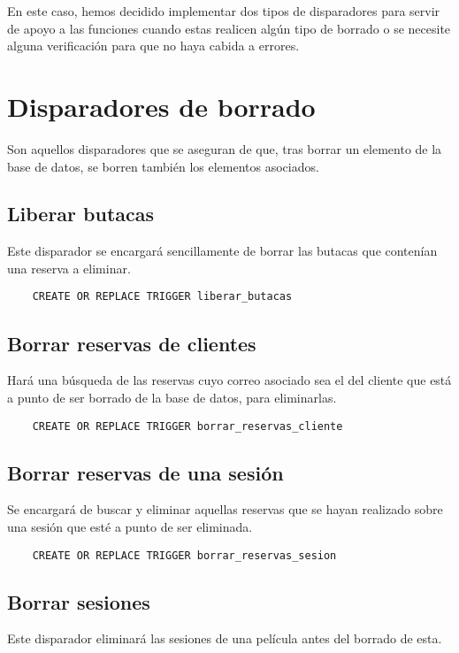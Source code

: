 En este caso, hemos decidido implementar dos tipos de disparadores para servir de apoyo a las funciones cuando estas realicen algún tipo de borrado o se necesite alguna verificación para que no haya cabida a errores.

\section{Disparadores de borrado}
Son aquellos disparadores que se aseguran de que, tras borrar un elemento de la base de datos, se borren también los elementos asociados.

\subsection{Liberar butacas}
Este disparador se encargará sencillamente de borrar las butacas que contenían una reserva a eliminar.

\begin{verbatim}
    CREATE OR REPLACE TRIGGER liberar_butacas
\end{verbatim}

\subsection{Borrar reservas de clientes}
Hará una búsqueda de las reservas cuyo correo asociado sea el del cliente que está a punto de ser borrado de la base de datos, para eliminarlas.

\begin{verbatim}
    CREATE OR REPLACE TRIGGER borrar_reservas_cliente
\end{verbatim}

\subsection{Borrar reservas de una sesión}
Se encargará de buscar y eliminar aquellas reservas que se hayan realizado sobre una sesión que esté a punto de ser eliminada.

\begin{verbatim}
    CREATE OR REPLACE TRIGGER borrar_reservas_sesion
\end{verbatim}

\subsection{Borrar sesiones}
Este disparador eliminará las sesiones de una película antes del borrado de esta.

